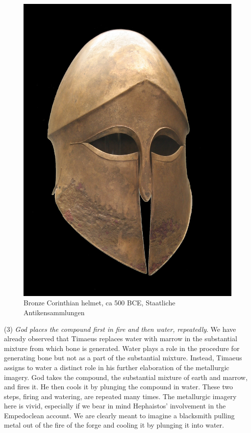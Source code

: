 \begin{figure}[htbp]
	\centering
		\includegraphics[scale=0.1]{graphics/helmet.jpg}
	\caption{Bronze Corinthian helmet, ca 500 BCE, Staatliche Antikensammlungen}
	\label{fig:helmet}
\end{figure}

(3) \emph{God places the compound first in fire and then water, repeatedly}. We have already observed that Timaeus replaces water with marrow in the substantial mixture from which bone is generated. Water plays a role in the procedure for generating bone but not as a part of the substantial mixture. Instead, Timaeus assigns to water a distinct role in his further elaboration of the metallurgic imagery. God takes the compound, the substantial mixture of earth and marrow, and fires it. He then cools it by plunging the compound in water. These two steps, firing and watering, are repeated many times. The metallurgic imagery here is vivid, especially if we bear in mind Hephaistos' involvement in the Empedoclean account. We are clearly meant to imagine a blacksmith pulling metal out of the fire of the forge and cooling it by plunging it into water. 

